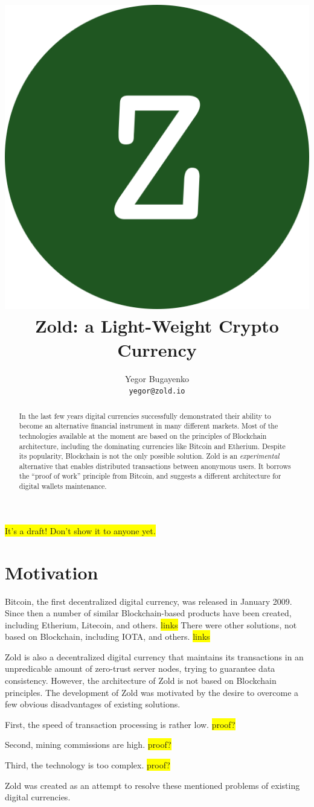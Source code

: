 \documentclass[11pt,oneside]{article}
\title{\includegraphics[scale=0.05]{logo.png}\\Zold: a Light-Weight Crypto Currency}
\author{Yegor Bugayenko\\\texttt{yegor@zold.io}}
\begin{document}
\raggedbottom

\maketitle
\begin{abstract}
In the last few years digital currencies successfully demonstrated
their ability to become an alternative financial instrument in many
different markets. Most of the technologies available at the moment are
based on the principles of Blockchain architecture, including the
dominating currencies like Bitcoin and Etherium. Despite its
popularity, Blockchain is not the only possible solution. Zold is
an \emph{experimental} alternative that enables distributed transactions between
anonymous users. It borrows the ``proof of work'' principle from Bitcoin,
and suggests a different architecture for digital wallets maintenance.
\end{abstract}

\colorbox{yellow}{It's a draft! Don't show it to anyone yet.}

\section{Motivation}

Bitcoin, the first decentralized digital currency, was released in
January 2009. Since then a number of similar Blockchain-based products have been
created, including Etherium, Litecoin, and others. \colorbox{yellow}{links} There were other solutions,
not based on Blockchain, including IOTA, and others. \colorbox{yellow}{links}

Zold is also a decentralized digital currency that maintains its transactions
in an unpredicable amount of zero-trust server nodes, trying to guarantee
data consistency. However, the architecture of Zold is not based on Blockchain
principles. The development of Zold was motivated by the desire to overcome
a few obvious disadvantages of existing solutions.

First, the speed of transaction processing is rather low. \colorbox{yellow}{proof?}

Second, mining commissions are high. \colorbox{yellow}{proof?}

Third, the technology is too complex. \colorbox{yellow}{proof?}

Zold was created as an attempt to resolve these mentioned problems
of existing digital currencies.

\end{document}
